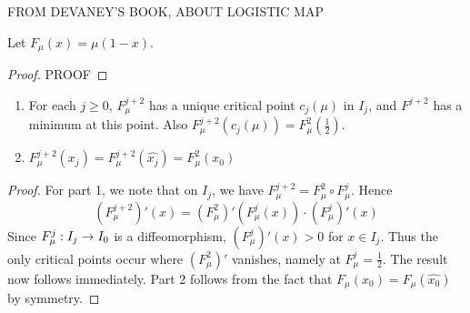 \documentclass[12pt]{report}
\begin{document}
\begin{center}
FROM DEVANEY'S BOOK, ABOUT LOGISTIC MAP
\end{center}


\begin{proposition}
	Let $F_{\mu} (x) = \mu (1-x)$.
\end{proposition}

\begin{proof}
	PROOF
\end{proof}

\begin{proposition}
	\begin{enumerate}
	\item For each $j \geq 0$, $F^{j+2}_{\mu}$ has a unique critical point $c_j (\mu)$ in $I_j$, and $F^{j+2}$ has a minimum at this point. Also $F^{j+2}_{\mu} (c_j (\mu))=F^2_{\mu}\left (\frac{1}{2}\right)$.

	\item $F^{j+2}_{\mu} (x_j) = F^{j+2}_{\mu} (\hat{x_j}) = F^2_{\mu} (x_0)$
	\end{enumerate}
\end{proposition}

\begin{proof}
	For part 1, we note that on $I_j$, we have $F^{j+2}_{\mu} = F^2_{\mu}\circ F^j_{\mu}$. Hence 
	\[
		\left (F^{j+2}_{\mu}\right)' (x) = \left (F^2_{\mu}\right)'\left (F^j_{\mu} (x)\right)\cdot \left (F^j_{\mu}\right)' (x)
	\]
	Since $F^j_{\mu}: I_j \rightarrow I_0$ is a diffeomorphism, $ (F_{\mu}^j)' (x) > 0$ for $x \in I_j$. Thus the only critical points occur where $ (F^2_{\mu})'$ vanishes, namely at $F^j_{\mu} = \frac{1}{2}$. The result now follows immediately. Part 2 follows from the fact that $F_{\mu} (x_0) = F_{\mu} (\hat{x_0})$ by symmetry.
\end{proof}
\end{document}
